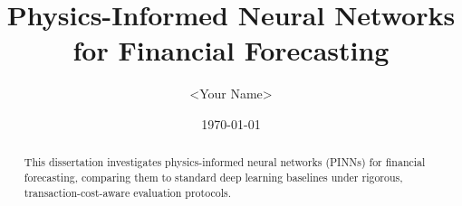 \documentclass[12pt]{report}
\title{Physics-Informed Neural Networks for Financial Forecasting}
\author{<Your Name>}
\date{\today}
\begin{document}
\maketitle
\begin{abstract}
This dissertation investigates physics-informed neural networks (PINNs) for financial forecasting, comparing them to standard deep learning baselines under rigorous, transaction-cost-aware evaluation protocols.%
\end{abstract}
\tableofcontents








\appendix




\end{document}
